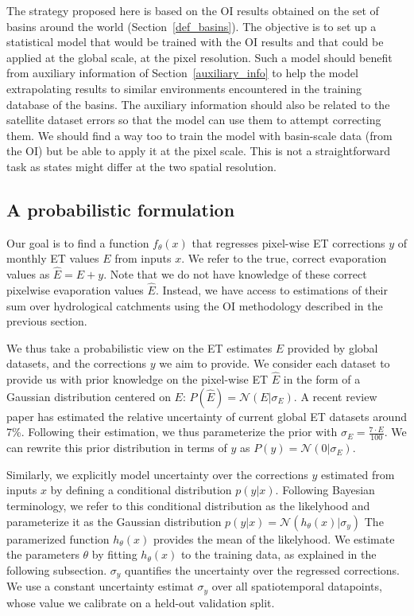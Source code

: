 \documentclass[draft]{agujournal2019}
\begin{document}
The strategy proposed here is based on the OI results obtained on the set of basins around the world (Section~\ref{def_basins}). 
The objective is to set up a statistical model that would be trained with the OI results and that could be applied at the global scale, at the pixel resolution. 
Such a model should benefit from auxiliary information of Section~\ref{auxiliary_info} to help the model extrapolating results to similar environments encountered in the training database of the basins. 
The auxiliary information should also be related to the satellite dataset errors so that the model can use them to attempt correcting them.
 We should find a way too to train the model with basin-scale data (from the OI) but be able to apply it at the pixel scale. 
This is not a straightforward task as states might differ at the two spatial resolution.

\subsection{A probabilistic formulation}

Our goal is to find a function $f_{\theta}(x)$ that regresses pixel-wise ET corrections $y$ of monthly ET values $E$ from inputs $x$.
We refer to the true, correct evaporation values as $\hat E = E + y$.
Note that we do not have knowledge of these correct pixelwise evaporation values $\hat E$.
Instead, we have access to estimations of their sum over hydrological catchments using the OI methodology described in the previous section.

We thus take a probabilistic view on the ET estimates $E$ provided by global datasets, and the corrections $y$ we aim to provide.
We consider each dataset to provide us with prior knowledge on the pixel-wise ET $\hat E$ 
in the form of a Gaussian distribution centered on $E$:  $P(\hat E)=\mathcal{N}(E | \sigma_E)$. 
A recent review paper \cite{XXX} has estimated the relative uncertainty of current global ET datasets around 7\%.
Following their estimation, we thus parameterize the prior with $\sigma_E= \frac{7 \cdot E}{100}$.
We can rewrite this prior distribution in terms of $y$ as $P(y)=\mathcal{N}(0 | \sigma_E)$.

Similarly, we explicitly model uncertainty over the corrections $y$ estimated from inputs $x$ by defining a conditional distribution $p(y|x)$.
Following Bayesian terminology, we refer to this conditional distribution as the likelyhood and parameterize it as the Gaussian distribution $p(y|x)=\mathcal{N}(h_\theta(x) | \sigma_y)$
The paramerized function $h_\theta(x)$ provides the mean of the likelyhood.
We estimate the parameters $\theta$ by fitting $h_\theta(x)$ to the training data, 
as explained in the following subsection.
$\sigma_{y}$ quantifies the uncertainty over the regressed corrections.
We use a constant uncertainty estimat $\sigma_{y}$ over all spatiotemporal datapoints,
whose value we calibrate on a held-out validation split.
\end{document}

